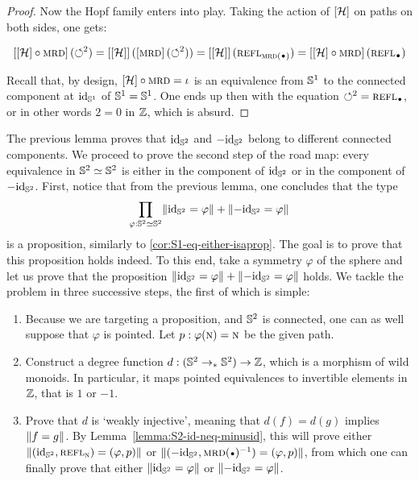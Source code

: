 \documentclass[english,a4paper]{lmcs}
\begin{document}
\begin{proof}
  Now the Hopf family enters into play. Taking the action of $\left[{{\mathcal H}}\right]$ on
  paths on both sides, one gets:

  \begin{displaymath}
    \ap{\ap\hopf\circ \mrd}(\Sloop^2) = \ap{\ap\hopf}(\ap\mrd(\Sloop^2)) =
    \ap{\ap\hopf}(\refl{\mrd(\base)}) = \ap{\ap\hopf\circ \mrd}(\refl{\base})
  \end{displaymath}

  Recall that, by design, ${\left[{{\mathcal H}}\right]}\circ{\operatorname{\textsc{mrd}}} = \iota$ is an equivalence
  from ${{\mathbb S^{1}}}$ to the connected component at $\mathord{\mathrm{id}}_{{\mathbb S^{1}}}$ of ${{\mathbb S^{1}}}={{\mathbb S^{1}}}$. One ends up
  then with the equation $\Sloop^2 = \refl \base$, or in other words $2=0$ in
  $\mathbb{Z}$, which is absurd.
\end{proof}

The previous lemma proves that $\mathord{\mathrm{id}}_{{\mathbb S^{2}}}$ and $-\mathord{\mathrm{id}}_{{\mathbb S^{2}}}$ belong
to different connected components. We proceed to prove the second step
of the road map: every equivalence in ${{\mathbb S^{2}}} \simeq {{\mathbb S^{2}}}$ is
either in the component of $\mathord{\mathrm{id}}_{{\mathbb S^{2}}}$ or in the component of $-\mathord{\mathrm{id}}_{{\mathbb S^{2}}}$.
First, notice that from the previous lemma, one concludes that the type
\begin{displaymath}
  \prod_{\varphi:{{\mathbb S^{2}}}\simeq{{\mathbb S^{2}}}}\lVert\mathord{\mathrm{id}}_{{\mathbb S^{2}}} = \varphi\rVert + \lVert-\mathord{\mathrm{id}}_{{\mathbb S^{2}}} = \varphi\rVert
\end{displaymath}
is a proposition, similarly to \cref{cor:S1-eq-either-isaprop}.
The goal is to prove that this proposition
holds indeed. To this end, take a symmetry $\varphi$ of the sphere and let us
prove that the proposition $\lVert\mathord{\mathrm{id}}_{{\mathbb S^{2}}} = \varphi\rVert + \lVert-\mathord{\mathrm{id}}_{{\mathbb S^{2}}} =
\varphi\rVert$ holds. We tackle the problem in three successive steps,
the first of which is simple:
\begin{enumerate}
  \item Because we are targeting a proposition, and ${{\mathbb S^{2}}}$ is
    connected, one can as well suppose that $\varphi$ is pointed.
    Let $p:\varphi(\textsc{n})=\textsc{n}$ be the given path.
  \item Construct a degree function $d: ({{\mathbb S^{2}}} \to_\ast {{\mathbb S^{2}}}) \to \mathbb{Z}$, which is a
    morphism of wild monoids. In particular, it maps pointed equivalences to
    invertible elements in $\mathbb{Z}$, that is $1$ or $-1$.
  \item Prove that $d$ is `weakly injective', meaning that $d(f)=d(g)$
    implies $\lVert f=g\rVert$. By Lemma~\ref{lemma:S2-id-neq-minusid},
    this will prove either $\lVert(\mathord{\mathrm{id}}_{{\mathbb S^{2}}},\mathop{{\textsc{refl}}_{\textsc{n}}})=(\varphi,p)\rVert$
    or $\Trunc{(-\id_\Sp,\inv{\mrd(\base)})=(\varphi,p)}$, from which
    one can finally prove that either $\lVert\mathord{\mathrm{id}}_{{\mathbb S^{2}}} = \varphi\rVert$ or
    $\lVert-\mathord{\mathrm{id}}_{{\mathbb S^{2}}} = \varphi\rVert$.\label{it:weakly_injective}
\end{enumerate}
\end{document}
